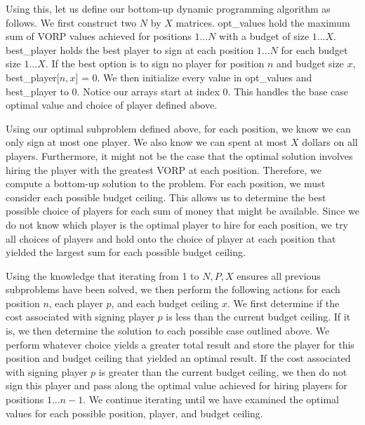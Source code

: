 \documentclass[11pt]{article}
\begin{document}
Using this, let us define our bottom-up dynamic programming algorithm as follows. We first construct two $N$ by $X$ matrices. opt\_values hold the maximum sum of VORP values achieved for positions $1...N$ with a budget of size $1...X$. best\_player holds the best player to sign at each position $1...N$ for each budget size $1...X$. If the best option is to sign no player for position $n$ and budget size $x$, best\_player[$n,x$] = 0. We then initialize every value in opt\_values and best\_player to 0. Notice our arrays start at index 0. This handles the base case optimal value and choice of player defined above.

Using our optimal subproblem defined above, for each position, we know we can only sign at most one player. We also know we can spent at most $X$ dollars on all players. Furthermore, it might not be the case that the optimal solution involves hiring the player with the greatest VORP at each position. Therefore, we compute a bottom-up solution to the problem. For each position, we must consider each possible budget ceiling. This allows us to determine the best possible choice of players for each sum of money that might be available. Since we do not know which player is the optimal player to hire for each position, we try all choices of players and hold onto the choice of player at each position that yielded the largest sum for each possible budget ceiling.

Using the knowledge that iterating from 1 to $N,P,X$ ensures all previous subproblems have been solved, we then perform the following actions for each position $n$, each player $p$, and each budget ceiling $x$. We first determine if the cost associated with signing player $p$ is less than the current budget ceiling. If it is, we then determine the solution to each possible case outlined above. We perform whatever choice yields a greater total result and store the player for this position and budget ceiling that yielded an optimal result. If the cost associated with signing player $p$ is greater than the current budget ceiling, we then do not sign this player and pass along the optimal value achieved for hiring players for positions $1...n-1$. We continue iterating until we have examined the optimal values for each possible position, player, and budget ceiling.
\end{document}
